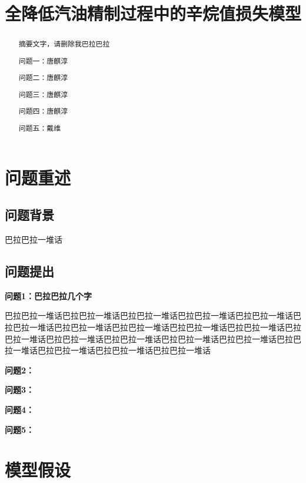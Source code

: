 \documentclass[bwprint]{gmcmthesis}
\title{全降低汽油精制过程中的辛烷值损失模型}
\begin{document}
 \maketitle


\begin{abstract}
摘要文字，请删除我巴拉巴拉


问题一：唐麒淳

问题二：唐麒淳

问题三：唐麒淳

问题四：唐麒淳

问题五：戴维

\end{abstract}



\pagestyle{plain}


\tableofcontents
\newpage


\section{问题重述}
\subsection{问题背景}
巴拉巴拉一堆话
\subsection{问题提出}

\textbf{问题1：巴拉巴拉几个字}

巴拉巴拉一堆话巴拉巴拉一堆话巴拉巴拉一堆话巴拉巴拉一堆话巴拉巴拉一堆话巴拉巴拉一堆话巴拉巴拉一堆话巴拉巴拉一堆话巴拉巴拉一堆话巴拉巴拉一堆话巴拉巴拉一堆话巴拉巴拉一堆话巴拉巴拉一堆话巴拉巴拉一堆话巴拉巴拉一堆话巴拉巴拉一堆话巴拉巴拉一堆话巴拉巴拉一堆话巴拉巴拉一堆话


\textbf{问题2：}

\textbf{问题3：}

\textbf{问题4：}

\textbf{问题5：}


\section{模型假设}
\end{document}
